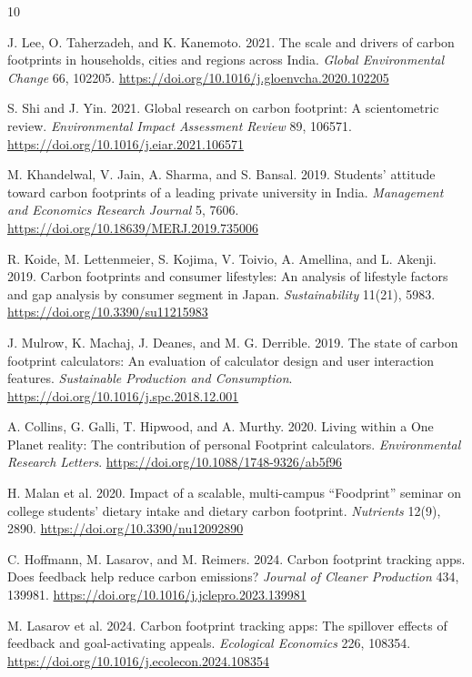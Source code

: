 \documentclass[10pt,a4paper,twocolumn]{article}
\begin{document}
\begin{thebibliography}{10}
\small
\setlength{\itemsep}{1.5pt}

J. Lee, O. Taherzadeh, and K. Kanemoto. 2021. The scale and drivers of carbon footprints in households, cities and regions across India. \emph{Global Environmental Change} 66, 102205. \url{https://doi.org/10.1016/j.gloenvcha.2020.102205}

S. Shi and J. Yin. 2021. Global research on carbon footprint: A scientometric review. \emph{Environmental Impact Assessment Review} 89, 106571. \url{https://doi.org/10.1016/j.eiar.2021.106571}

M. Khandelwal, V. Jain, A. Sharma, and S. Bansal. 2019. Students' attitude toward carbon footprints of a leading private university in India. \emph{Management and Economics Research Journal} 5, 7606. \url{https://doi.org/10.18639/MERJ.2019.735006}

R. Koide, M. Lettenmeier, S. Kojima, V. Toivio, A. Amellina, and L. Akenji. 2019. Carbon footprints and consumer lifestyles: An analysis of lifestyle factors and gap analysis by consumer segment in Japan. \emph{Sustainability} 11(21), 5983. \url{https://doi.org/10.3390/su11215983}

J. Mulrow, K. Machaj, J. Deanes, and M. G. Derrible. 2019. The state of carbon footprint calculators: An evaluation of calculator design and user interaction features. \emph{Sustainable Production and Consumption}. \url{https://doi.org/10.1016/j.spc.2018.12.001}

A. Collins, G. Galli, T. Hipwood, and A. Murthy. 2020. Living within a One Planet reality: The contribution of personal Footprint calculators. \emph{Environmental Research Letters}. \url{https://doi.org/10.1088/1748-9326/ab5f96}

H. Malan et al. 2020. Impact of a scalable, multi-campus ``Foodprint'' seminar on college students' dietary intake and dietary carbon footprint. \emph{Nutrients} 12(9), 2890. \url{https://doi.org/10.3390/nu12092890}

C. Hoffmann, M. Lasarov, and M. Reimers. 2024. Carbon footprint tracking apps. Does feedback help reduce carbon emissions? \emph{Journal of Cleaner Production} 434, 139981. \url{https://doi.org/10.1016/j.jclepro.2023.139981}

M. Lasarov et al. 2024. Carbon footprint tracking apps: The spillover effects of feedback and goal-activating appeals. \emph{Ecological Economics} 226, 108354. \url{https://doi.org/10.1016/j.ecolecon.2024.108354}


\end{thebibliography}
\end{document}
